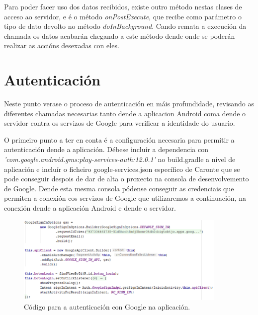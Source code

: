 Para poder facer uso dos datos recibidos, existe outro método nestas clases de acceso ao servidor, e é o método \emph{onPostExecute}, que recibe como parámetro o tipo de dato devolto no método \emph{doInBackground}. Cando remata a execución da chamada os datos acabarán chegando a este método dende onde se poderán realizar as accións desexadas con eles.


\section{Autenticación}
Neste punto verase o proceso de autenticación en máis profundidade, revisando as diferentes chamadas necesarias tanto dende a aplicacion Android coma dende o servidor contra os servizos de Google para verificar a identidade do usuario.

O primeiro punto a ter en conta é a configuración necesaria para permitir a autenticación dende a aplicación. Débese incluír a dependencia con \emph{'com.google.android.gms:play-services-auth:12.0.1'} no build.gradle a nivel de aplicación e incluír o ficheiro google-services.json específico de Caronte que se pode conseguir despois de dar de alta o proxecto na consola de desenvolvemento de Google. Dende esta mesma consola pódense conseguir as credenciais que permiten a conexión cos servizos de Google que utilizaremos a continuación, na conexión dende a aplicación Android e dende o servidor.





\begin{figure}[htb] 
	\begin{center}
		\includegraphics[width=0.9\textwidth]{figures/codigo/autenticacionGoogleInicio}
		\caption{Código para a autenticación con Google na aplicación.}
		\label{fig:autenticacionGoogleInicio}
	\end{center}
\end{figure}

